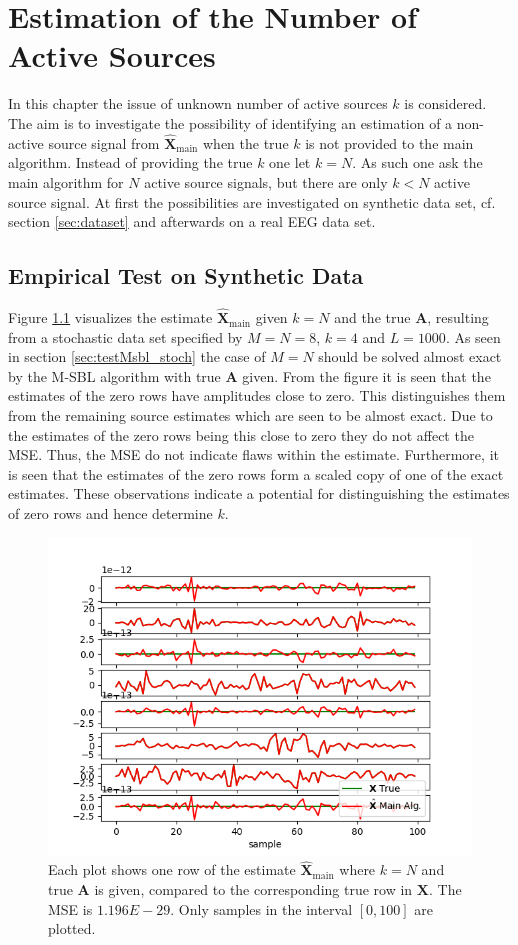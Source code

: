 \chapter{Estimation of the Number of Active Sources}\label{ch:estimation_k}
In this chapter the issue of unknown number of active sources $k$ is considered. 
The aim is to investigate the possibility of identifying an estimation of a non-active source signal from $\hat{\textbf{X}}_{\text{main}}$ when the true $k$ is not provided to the main algorithm. 
Instead of providing the true $k$ one let $k = N$.
As such one ask the main algorithm for $N$ active source signals, but there are only $k < N$ active source signal. 
At first the possibilities are investigated on synthetic data set, cf. section \ref{sec:dataset} and afterwards on a real EEG data set.   

\section{Empirical Test on Synthetic Data}
Figure \ref{fig:ktest1} visualizes the estimate $\hat{\mathbf{X}}_{\text{main}}$ given $k=N$ and the true $\textbf{A}$, resulting from a stochastic data set specified by $M = N = 8$, $k = 4$ and $L = 1000$. 
As seen in section \ref{sec:testMsbl_stoch} the case of $M = N$ should be solved almost exact by the M-SBL algorithm with true $\mathbf{A}$ given. 
From the figure it is seen that the estimates of the zero rows have amplitudes close to zero.
This distinguishes them from the remaining source estimates which are seen to be almost exact. 
Due to the estimates of the zero rows being this close to zero they do not affect the MSE. 
Thus, the MSE do not indicate flaws within the estimate. 
Furthermore, it is seen that the estimates of the zero rows form a scaled copy of one of the exact estimates. 
These observations indicate a potential for distinguishing the estimates of zero rows and hence determine $k$.     
\begin{figure}[H]
    \centering
	\includegraphics[scale=0.5]{figures/ch_estimate/k_test1.png}
	\caption{Each plot shows one row of the estimate $\hat{\mathbf{X}}_{\text{main}}$ where $k=N$ and true $\mathbf{A}$ is given, compared to the corresponding true row in $\mathbf{X}$. The MSE is $1.196E-29$. Only samples in the interval $[0,100]$ are plotted.}
	\label{fig:ktest1}
\end{figure}
